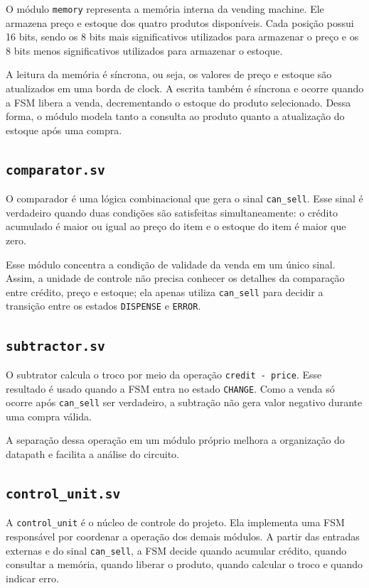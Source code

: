 \documentclass[11pt,a4paper]{article}
\begin{document}
O módulo \texttt{memory} representa a memória interna da vending machine. Ele armazena preço e estoque dos quatro produtos disponíveis. Cada posição possui 16 bits, sendo os 8 bits mais significativos utilizados para armazenar o preço e os 8 bits menos significativos utilizados para armazenar o estoque.

A leitura da memória é síncrona, ou seja, os valores de preço e estoque são atualizados em uma borda de clock. A escrita também é síncrona e ocorre quando a FSM libera a venda, decrementando o estoque do produto selecionado. Dessa forma, o módulo modela tanto a consulta ao produto quanto a atualização do estoque após uma compra.

\subsection{\texttt{comparator.sv}}

O comparador é uma lógica combinacional que gera o sinal \texttt{can\_sell}. Esse sinal é verdadeiro quando duas condições são satisfeitas simultaneamente: o crédito acumulado é maior ou igual ao preço do item e o estoque do item é maior que zero.

Esse módulo concentra a condição de validade da venda em um único sinal. Assim, a unidade de controle não precisa conhecer os detalhes da comparação entre crédito, preço e estoque; ela apenas utiliza \texttt{can\_sell} para decidir a transição entre os estados \texttt{DISPENSE} e \texttt{ERROR}.

\subsection{\texttt{subtractor.sv}}

O subtrator calcula o troco por meio da operação \texttt{credit - price}. Esse resultado é usado quando a FSM entra no estado \texttt{CHANGE}. Como a venda só ocorre após \texttt{can\_sell} ser verdadeiro, a subtração não gera valor negativo durante uma compra válida.

A separação dessa operação em um módulo próprio melhora a organização do datapath e facilita a análise do circuito.

\subsection{\texttt{control\_unit.sv}}

A \texttt{control\_unit} é o núcleo de controle do projeto. Ela implementa uma FSM responsável por coordenar a operação dos demais módulos. A partir das entradas externas e do sinal \texttt{can\_sell}, a FSM decide quando acumular crédito, quando consultar a memória, quando liberar o produto, quando calcular o troco e quando indicar erro.
\end{document}
